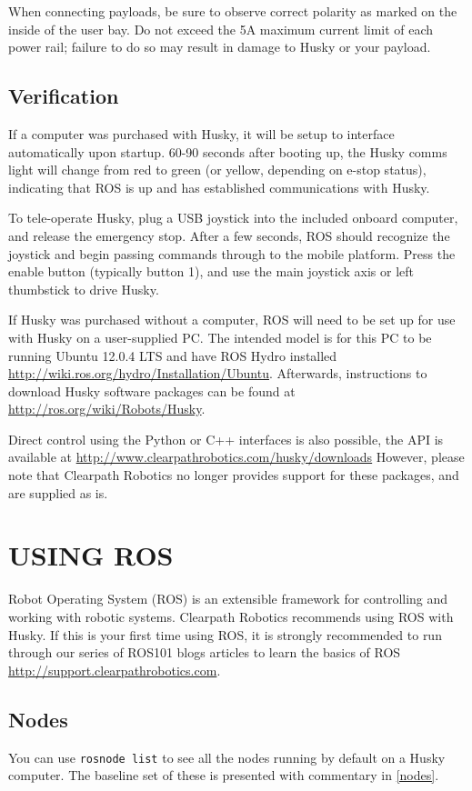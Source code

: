 \documentclass[]{clearpath-latex/clearpath-manual}
\begin{document}
When connecting payloads, be sure to observe correct polarity as marked on the inside of the user bay. 
Do not exceed the 5A maximum current limit of each power rail; failure to do so may result in damage 
to Husky or your payload.

\subsection{Verification}
If a computer was purchased with Husky, it will be setup to interface automatically upon startup. 
60-90 seconds after booting up, the Husky comms light will change from red to green 
(or yellow, depending on e-stop status), indicating that ROS is up and has established communications with Husky.

To tele-operate Husky, plug a USB joystick into the included onboard computer, and release the emergency stop. 
After a few seconds, ROS should recognize the joystick and begin passing commands through to the mobile platform. 
Press the enable button (typically button 1), and use the main joystick axis or left thumbstick to drive Husky.

If Husky was purchased without a computer, ROS will need to be set up for use with Husky on a user-supplied PC. 
The intended model is for this PC to be running Ubuntu 12.0.4 LTS and have ROS Hydro installed 
\url{http://wiki.ros.org/hydro/Installation/Ubuntu}. Afterwards, instructions to download Husky software 
packages can be found at \url{http://ros.org/wiki/Robots/Husky}.

Direct control using the Python or C++ interfaces is also possible, the API is available at
\url{http://www.clearpathrobotics.com/husky/downloads} However, please note that Clearpath Robotics no 
longer provides support for these packages, and are supplied as is.

\section{USING ROS}
Robot Operating System (ROS) is an extensible framework for controlling and working with robotic systems. 
Clearpath Robotics recommends using ROS with Husky. If this is your first time using ROS, it is strongly 
recommended to run through our series of ROS101 blogs articles to learn the basics of ROS 
\url{http://support.clearpathrobotics.com}.

\subsection{Nodes}
You can use \lstinline{rosnode list} to see all the nodes running by default on a Husky computer. 
The baseline set of these is presented with commentary in \autoref{nodes}.
\end{document}
